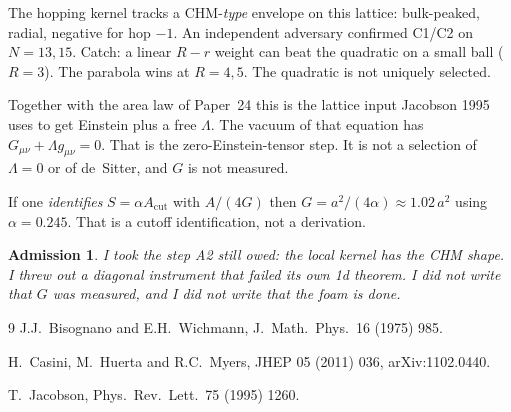 \documentclass[11pt]{article}
\newtheorem*{admission}{Admission}
\begin{document}
The hopping kernel tracks a CHM-\emph{type} envelope on this
lattice: bulk-peaked, radial, negative for hop $-1$. An
independent adversary confirmed C1/C2 on $N=13,15$. Catch: a
linear $R-r$ weight can beat the quadratic on a small ball
($R=3$). The parabola wins at $R=4,5$. The quadratic is not
uniquely selected.

Together with the area law of Paper~24 this is the lattice input
Jacobson 1995 uses to get Einstein plus a free $\Lambda$. The
vacuum of that equation has $G_{\mu\nu}+\Lambda g_{\mu\nu}=0$.
That is the zero-Einstein-tensor step. It is not a selection of
$\Lambda=0$ or of de~Sitter, and $G$ is not measured.

If one \emph{identifies} $S=\alpha A_{\mathrm{cut}}$ with
$A/(4G)$ then $G=a^2/(4\alpha)\approx 1.02\,a^2$ using
$\alpha=0.245$. That is a cutoff identification, not a derivation.

\begin{admission}
I took the step A2 still owed: the local kernel has the CHM
shape. I threw out a diagonal instrument that failed its own
1d theorem. I did not write that $G$ was measured, and I did
not write that the foam is done.
\end{admission}

\begin{thebibliography}{9}
J.J.~Bisognano and E.H.~Wichmann,
J.\ Math.\ Phys.\ 16 (1975) 985.

H.~Casini, M.~Huerta and R.C.~Myers,
JHEP 05 (2011) 036,
arXiv:1102.0440.

T.~Jacobson,
Phys.\ Rev.\ Lett.\ 75 (1995) 1260.
\end{thebibliography}
\end{document}
